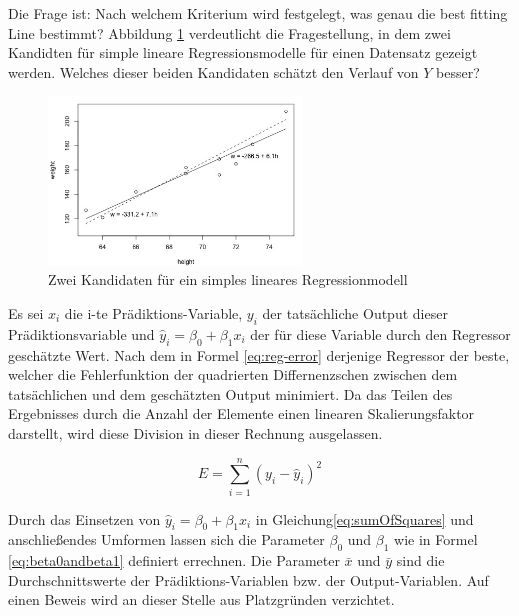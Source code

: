 Die Frage ist: Nach welchem Kriterium wird festgelegt, was genau die \glqq best fitting Line\grqq{} bestimmt? Abbildung \ref{img:best_fitting_line} verdeutlicht die Fragestellung, in dem zwei Kandidten für simple lineare Regressionsmodelle für einen Datensatz gezeigt werden. Welches dieser beiden Kandidaten schätzt den Verlauf von $Y$ besser? \cite[What is the Best Fitting Line?]{regression_lecture}

\begin{figure}[h]
	\centering
	\includegraphics[width=0.6\textwidth]{bilder/heightweight.jpeg}
	\caption{Zwei Kandidaten für ein simples lineares Regressionmodell}
	\label{img:best_fitting_line}
\end{figure}

Es sei $x_i$ die i-te Prädiktions-Variable, $y_i$ der tatsächliche Output dieser Prädiktionsvariable und $\hat{y}_i =  \beta_0 + \beta_1 x_i$ der für diese Variable durch den Regressor geschätzte Wert. Nach dem in Formel \ref{eq:reg-error} derjenige Regressor der beste, welcher die Fehlerfunktion der quadrierten Differnenzschen zwischen dem tatsächlichen und dem geschätzten Output minimiert. Da das Teilen des Ergebnisses durch die Anzahl der Elemente einen linearen Skalierungsfaktor darstellt, wird  diese Division in dieser Rechnung ausgelassen.

\begin{equation}
\label{eq:sumOfSquares}
E = \sum_{i = 1}^{n} (y_i - \hat{y}_i)^2
\end{equation}

Durch das Einsetzen von $\hat{y}_i =  \beta_0 + \beta_1 x_i$ in Gleichung\ref{eq:sumOfSquares} und anschließendes Umformen lassen sich die Parameter $\beta_0$ und  $\beta_1$ wie in Formel \ref{eq:beta0andbeta1} definiert errechnen. Die Parameter $\bar{x}$ und $\bar{y}$ sind die Durchschnittswerte der Prädiktions-Variablen bzw. der Output-Variablen. Auf einen Beweis wird an dieser Stelle aus Platzgründen verzichtet.\cite[S. 62]{statistical_learning}

